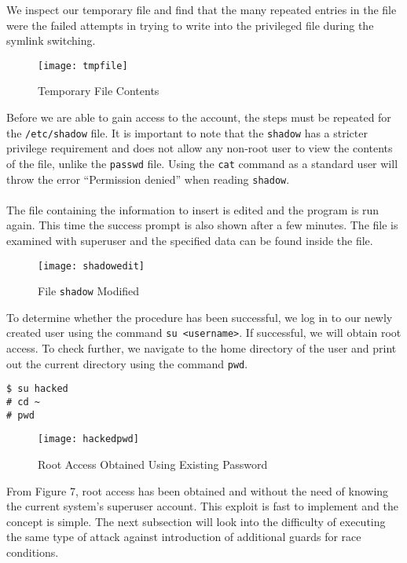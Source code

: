 \documentclass[a4paper,12pt]{article}
\begin{document}
\noindent We inspect our temporary file and find that the many repeated entries in the file were the failed attempts in trying to write into the privileged file during the symlink switching.
\begin{figure}[H]
	\centering
	\texttt{[image: tmpfile]}
	\caption{Temporary File Contents}
	\label{fig:tmpfile}
\end{figure}
\noindent Before we are able to gain access to the account, the steps must be repeated for the \texttt{/etc/shadow} file. It is important to note that the \texttt{shadow} has a stricter privilege requirement and does not allow any non-root user to view the contents of the file, unlike the \texttt{passwd} file. Using the \texttt{cat} command as a standard user will throw the error ``Permission denied'' when reading \texttt{shadow}.\\\\The file containing the information to insert is edited and the program is run again. This time the success prompt is also shown after a few minutes. The file is examined with superuser and the specified data can be found inside the file.
\begin{figure}[H]
	\centering
	\texttt{[image: shadowedit]}
	\caption{File \texttt{shadow} Modified}
	\label{fig:shadowedit}
\end{figure}
\noindent To determine whether the procedure has been successful, we log in to our newly created user using the command \texttt{su <username>}. If successful, we will obtain root access. To check further, we navigate to the home directory of the user and print out the current directory using the command \texttt{pwd}.
\begin{verbatim}
$ su hacked
# cd ~
# pwd
\end{verbatim}
\begin{figure}[H]
	\centering
	\texttt{[image: hackedpwd]}
	\caption{Root Access Obtained Using Existing Password}
	\label{fig:hackedpwd}
\end{figure}
From Figure 7, root access has been obtained and without the need of knowing the current system's superuser account. This exploit is fast to implement and the concept is simple. The next subsection will look into the difficulty of executing the same type of attack against introduction of additional guards for race conditions.
\end{document}
